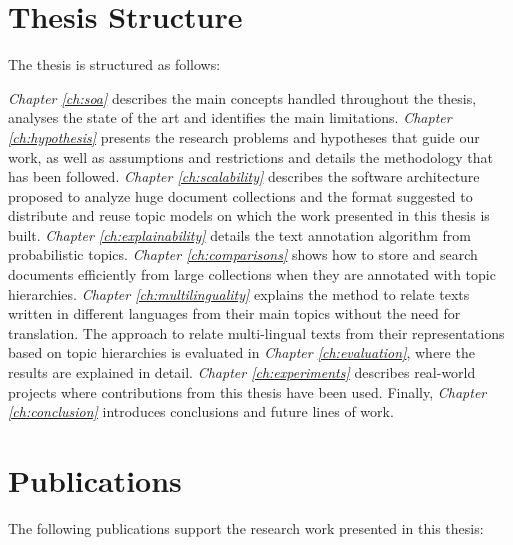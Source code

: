 \section{Thesis Structure}

The thesis is structured as follows:

\textit{Chapter \ref{ch:soa}} describes the main concepts handled throughout the thesis, analyses the state of the art and identifies the main limitations. \textit{Chapter \ref{ch:hypothesis}} presents the research problems and hypotheses that guide our work, as well as assumptions and restrictions and details the methodology that has been followed. \textit{Chapter \ref{ch:scalability}} describes the software architecture proposed to analyze huge document collections and the format suggested to distribute and reuse topic models on which the work presented in this thesis is built. \textit{Chapter \ref{ch:explainability}} details the text annotation algorithm from probabilistic topics. \textit{Chapter \ref{ch:comparisons}} shows how to store and search documents efficiently from large collections when they are annotated with topic hierarchies.  \textit{Chapter \ref{ch:multilinguality}} explains the method to relate texts written in different languages from their main topics without the need for translation. The approach to relate multi-lingual texts from their representations based on topic hierarchies is evaluated in \textit{Chapter \ref{ch:evaluation}}, where the results are explained in detail. \textit{Chapter \ref{ch:experiments}} describes real-world projects where contributions from this thesis have been used. Finally, \textit{Chapter \ref{ch:conclusion}} introduces conclusions and future lines of work.


\section{Publications}

The following publications support the research work presented in this thesis:


